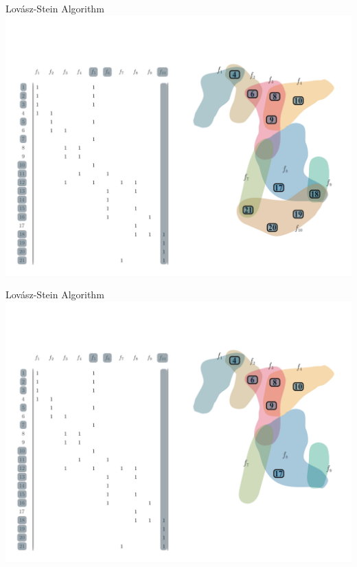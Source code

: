 \documentclass[10pt]{beamer}
\begin{document}
\begin{frame}[fragile]{Lovász-Stein Algorithm}
    \vspace*{-3em}\hspace*{-2em}\includegraphics[width=1.15\textwidth]{Images/LSAExample/07}
\end{frame}

\begin{frame}[fragile]{Lovász-Stein Algorithm}
    \vspace*{-3em}\hspace*{-2em}\includegraphics[width=1.15\textwidth]{Images/LSAExample/08}
\end{frame}
\end{document}
